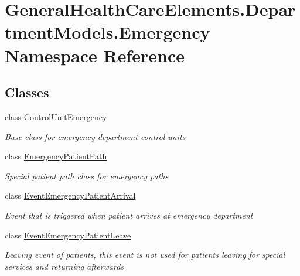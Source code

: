 \hypertarget{namespace_general_health_care_elements_1_1_department_models_1_1_emergency}{}\section{General\+Health\+Care\+Elements.\+Department\+Models.\+Emergency Namespace Reference}
\label{namespace_general_health_care_elements_1_1_department_models_1_1_emergency}
\subsection*{Classes}
\begin{DoxyCompactItemize}
\item 
class \hyperlink{class_general_health_care_elements_1_1_department_models_1_1_emergency_1_1_control_unit_emergency}{Control\+Unit\+Emergency}
\begin{DoxyCompactList}\small\item\em Base class for emergency department control units \end{DoxyCompactList}\item 
class \hyperlink{class_general_health_care_elements_1_1_department_models_1_1_emergency_1_1_emergency_patient_path}{Emergency\+Patient\+Path}
\begin{DoxyCompactList}\small\item\em Special patient path class for emergency paths \end{DoxyCompactList}\item 
class \hyperlink{class_general_health_care_elements_1_1_department_models_1_1_emergency_1_1_event_emergency_patient_arrival}{Event\+Emergency\+Patient\+Arrival}
\begin{DoxyCompactList}\small\item\em Event that is triggered when patient arrives at emergency department \end{DoxyCompactList}\item 
class \hyperlink{class_general_health_care_elements_1_1_department_models_1_1_emergency_1_1_event_emergency_patient_leave}{Event\+Emergency\+Patient\+Leave}
\begin{DoxyCompactList}\small\item\em Leaving event of patients, this event is not used for patients leaving for special services and returning afterwards \end{DoxyCompactList}\item 

\end{DoxyCompactItemize}
